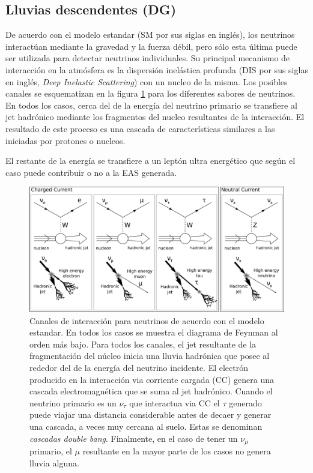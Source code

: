 \subsection{Lluvias descendentes (DG)}
\label{sbsc:easDG}

De acuerdo con el modelo estandar (SM por sus siglas en inglés), los neutrinos interactúan mediante la gravedad y la fuerza débil, pero sólo esta última puede ser utilizada para detectar neutrinos individuales.
Su principal mecanismo de interacción en la atmósfera es la dispersión inelástica profunda (DIS por sus siglas en inglés, \emph{Deep Inelastic Scattering}) con un nucleo de la misma. Los posibles canales se esquematizan en la figura \ref{fig:SM_nu_int} para los diferentes sabores de neutrinos.
En todos los casos, cerca del  de la energía del neutrino primario se transfiere al jet hadrónico mediante los fragmentos del nucleo resultantes de la interacción.
El resultado de este proceso es una cascada de características similares a las iniciadas por protones o nucleos.

El  restante de la energía se transfiere a un leptón ultra energético que según el caso puede contribuir o no a la EAS generada.
%
\begin{figure}[ht]
\begin{center}
\includegraphics[width=1.0\textwidth]{fig/EASAuger/nu_channels_english.pdf}
\caption{Canales de interacción para neutrinos de acuerdo con el modelo estandar.
En todos los casos se muestra el diagrama de Feynman al orden más bajo.
Para todos los canales, el jet resultante de la fragmentación del núcleo inicia una lluvia hadrónica que posee al rededor del  de la energía del neutrino incidente.
El electrón producido en la interacción via corriente cargada (CC) genera una cascada electromagnética que se suma al jet hadrónico.
Cuando el neutrino primario es un $\nu_{\tau}$ que interactua via CC el $\tau$ generado puede viajar una distancia considerable antes de decaer y generar una cascada, a veces muy cercana al suelo.
Estas se denominan \emph{cascadas double bang}.
Finalmente, en el caso de tener un $\nu_{\mu}$ primario, el $\mu$ resultante en la mayor parte de los casos no genera lluvia alguna.
}
\label{fig:SM_nu_int}
\end{center}
\end{figure}

